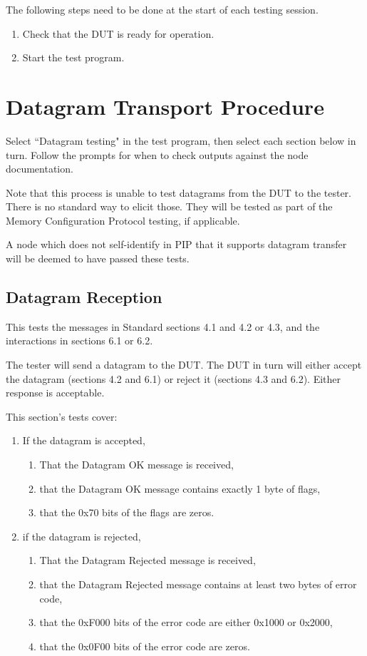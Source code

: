 \documentclass[11pt]{article}
\begin{document}
The following steps need to be done at the start of each testing session.
\begin{enumerate}
\item Check that the DUT is ready for operation.
\item Start the test program.
\end{enumerate}

\section{Datagram Transport Procedure}

Select ``Datagram testing" in the test program, 
then select each section below in turn.  Follow the prompts
for when to check outputs against the node documentation.

Note that this process is unable to test datagrams from the DUT to the tester.
There is no standard way to elicit those.  They will be tested as part of the 
Memory Configuration Protocol testing, if applicable.

A node which does not self-identify in PIP that it supports
datagram transfer will be deemed to have passed these tests.

\subsection{Datagram Reception}

This tests the messages in Standard sections 4.1 and 4.2 or 4.3, 
and the interactions in sections 6.1 or 6.2.

The tester will send a datagram to the DUT. The DUT in turn will 
either accept the datagram (sections 4.2 and 6.1) or 
reject it (sections 4.3 and 6.2). Either response is acceptable.

This section's tests cover:

\begin{enumerate}
\item If the datagram is accepted,
    \begin{enumerate}
    \item That the Datagram OK message is received,
    \item that the Datagram OK message contains exactly 1 byte of flags,
    \item that the 0x70 bits of the flags are zeros.
    \end{enumerate}
\item if the datagram is rejected, 
    \begin{enumerate}
    \item That the Datagram Rejected message is received,
    \item that the Datagram Rejected message contains at least two bytes of error code,
    \item that the 0xF000 bits of the error code are either 0x1000 or 0x2000,
    \item that the 0x0F00 bits of the error code are zeros.
    \end{enumerate}
\end{enumerate}
\end{document}
